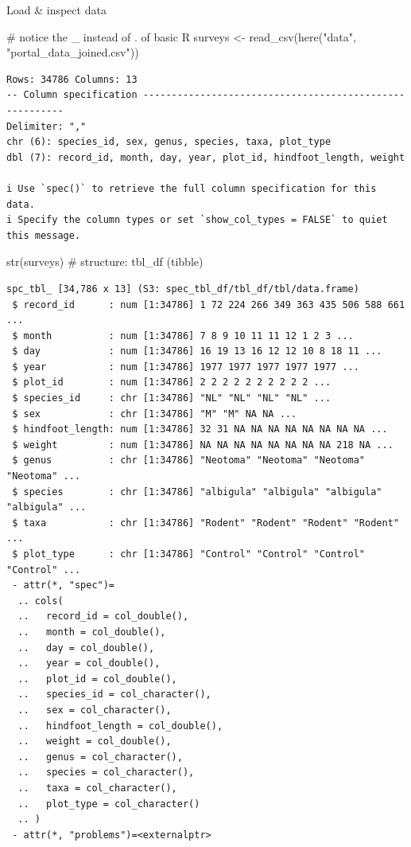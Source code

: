 \documentclass[
  letterpaper,
  DIV=11,
  numbers=noendperiod]{scrreprt}
\newenvironment{Shaded}{\begin{snugshade}}{\end{snugshade}}
\newcommand{\CommentTok}[1]{\textcolor[rgb]{0.37,0.37,0.37}{#1}}
\newcommand{\FunctionTok}[1]{\textcolor[rgb]{0.28,0.35,0.67}{#1}}
\newcommand{\NormalTok}[1]{\textcolor[rgb]{0.00,0.23,0.31}{#1}}
\newcommand{\OtherTok}[1]{\textcolor[rgb]{0.00,0.23,0.31}{#1}}
\newcommand{\StringTok}[1]{\textcolor[rgb]{0.13,0.47,0.30}{#1}}
\begin{document}
Load \& inspect data

\begin{Shaded}
\begin{Highlighting}[]
\CommentTok{\# notice the \textquotesingle{}\_\textquotesingle{} instead of \textquotesingle{}.\textquotesingle{} of basic R}
\NormalTok{surveys }\OtherTok{\textless{}{-}} \FunctionTok{read\_csv}\NormalTok{(}\FunctionTok{here}\NormalTok{(}\StringTok{"data"}\NormalTok{, }\StringTok{"portal\_data\_joined.csv"}\NormalTok{))}
\end{Highlighting}
\end{Shaded}

\begin{verbatim}
Rows: 34786 Columns: 13
-- Column specification --------------------------------------------------------
Delimiter: ","
chr (6): species_id, sex, genus, species, taxa, plot_type
dbl (7): record_id, month, day, year, plot_id, hindfoot_length, weight

i Use `spec()` to retrieve the full column specification for this data.
i Specify the column types or set `show_col_types = FALSE` to quiet this message.
\end{verbatim}

\begin{Shaded}
\begin{Highlighting}[]
\FunctionTok{str}\NormalTok{(surveys)    }\CommentTok{\# structure: tbl\_df (tibble)}
\end{Highlighting}
\end{Shaded}

\begin{verbatim}
spc_tbl_ [34,786 x 13] (S3: spec_tbl_df/tbl_df/tbl/data.frame)
 $ record_id      : num [1:34786] 1 72 224 266 349 363 435 506 588 661 ...
 $ month          : num [1:34786] 7 8 9 10 11 11 12 1 2 3 ...
 $ day            : num [1:34786] 16 19 13 16 12 12 10 8 18 11 ...
 $ year           : num [1:34786] 1977 1977 1977 1977 1977 ...
 $ plot_id        : num [1:34786] 2 2 2 2 2 2 2 2 2 2 ...
 $ species_id     : chr [1:34786] "NL" "NL" "NL" "NL" ...
 $ sex            : chr [1:34786] "M" "M" NA NA ...
 $ hindfoot_length: num [1:34786] 32 31 NA NA NA NA NA NA NA NA ...
 $ weight         : num [1:34786] NA NA NA NA NA NA NA NA 218 NA ...
 $ genus          : chr [1:34786] "Neotoma" "Neotoma" "Neotoma" "Neotoma" ...
 $ species        : chr [1:34786] "albigula" "albigula" "albigula" "albigula" ...
 $ taxa           : chr [1:34786] "Rodent" "Rodent" "Rodent" "Rodent" ...
 $ plot_type      : chr [1:34786] "Control" "Control" "Control" "Control" ...
 - attr(*, "spec")=
  .. cols(
  ..   record_id = col_double(),
  ..   month = col_double(),
  ..   day = col_double(),
  ..   year = col_double(),
  ..   plot_id = col_double(),
  ..   species_id = col_character(),
  ..   sex = col_character(),
  ..   hindfoot_length = col_double(),
  ..   weight = col_double(),
  ..   genus = col_character(),
  ..   species = col_character(),
  ..   taxa = col_character(),
  ..   plot_type = col_character()
  .. )
 - attr(*, "problems")=<externalptr> 
\end{verbatim}
\end{document}
